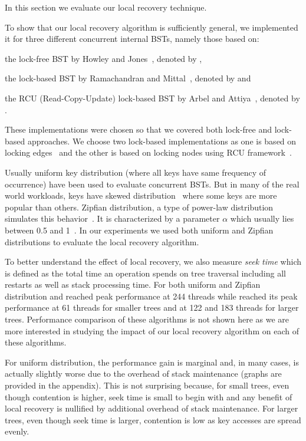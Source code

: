In this section we evaluate our local recovery technique. 

To show that our local recovery algorithm is sufficiently general, we implemented it for three different concurrent internal BSTs, namely those based on:
\begin{enumerate*}[label=(\roman*)]
\item the lock-free BST by Howley and Jones~\cite{HowJon:2012:SPAA}, denoted by \HJBST{},
\item the lock-based BST by Ramachandran and Mittal~\cite{RamMit:2015:PPoPP}, denoted by \CASTLE{} and
\item the RCU (Read-Copy-Update) lock-based BST by Arbel and Attiya~\cite{ArbAtt:2014:PODC}, denoted by \CITRUS{}.
\end{enumerate*}
These implementations were chosen so that we covered both lock-free and lock-based approaches. We choose two lock-based implementations as one is based on locking edges~\cite{RamMit:2015:PPoPP} and the other is based on locking nodes using RCU framework~\cite{ArbAtt:2014:PODC}.

Usually uniform key distribution (where all keys have same frequency of occurrence) have been used to evaluate concurrent BSTs. But in many of the real world workloads, keys have skewed distribution~\cite{ClaSha+:2009:SIAM} where some keys are more popular than others. Zipfian distribution, a type of power-law distribution simulates this behavior~\cite{BreCao+:1999:INFOCOM,FalJag:1992:VLDB,GraSun+:1994:SIGMOD}. It is characterized by a parameter $\alpha$ which usually lies between 0.5 and 1~\cite{BreCao+:1999:INFOCOM,AdaHub:2002:GLOTTMET}. In our experiments we used both uniform and Zipfian distributions to evaluate the local recovery algorithm.

To better understand the effect of local recovery, we also measure \emph{seek time} which is defined as the total time an operation spends on tree traversal including all restarts as well as stack processing time. For both uniform and Zipfian distribution \CASTLE{} and \HJBST{} reached peak performance at 244 threads while \CITRUS{} reached its peak performance at 61 threads for smaller trees and at 122 and 183 threads for larger trees. Performance comparison of these algorithms is not shown here as we are more interested in studying the impact of our local recovery algorithm on each of these algorithms. 

For uniform distribution, the performance gain is marginal and, in many cases, is actually slightly worse due to the overhead of stack maintenance (graphs are provided in the appendix). This is not surprising because, for small trees, even though contention is higher, seek time is small to begin with and any benefit of local recovery is nullified by additional overhead of stack maintenance. For larger trees, even though seek time is larger, contention is low as key accesses are spread evenly. 

